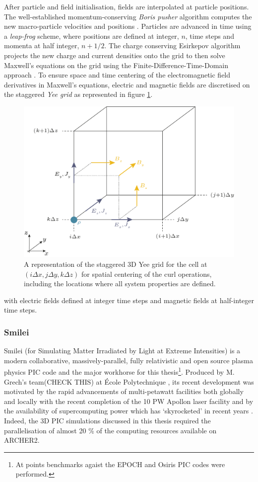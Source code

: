 After particle and field initialisation, fields are interpolated at particle positions. The well-established momentum-conserving \textit{Boris pusher} algorithm computes the new macro-particle velocities and positions \cite{borisRelativisticPlasmaSimulationoptimization1970}. Particles are advanced in time using a \textit{leap-frog }scheme, where positions are defined at integer, $n$, time steps and momenta at half integer, $n + 1/2$. The charge conserving Esirkepov algorithm \cite{esirkepovExactChargeConservation2001} projects the new charge and current densities onto the grid to then solve Maxwell's equations on the grid using the Finite-Difference-Time-Domain approach \cite{tafloveComputationalElectromagneticsFiniteDifference2005}. To ensure space and time centering of the electromagnetic field derivatives in Maxwell's equations, electric and magnetic fields are discretised on the staggered \textit{Yee grid} as represented in figure \ref{fig:introyeegrid}. 
\begin{figure}
	\centering
	\includegraphics[width=0.7\linewidth]{figures/intro/intro_yee_grid}
	\caption[A representation of the staggered Yee grid.]{A representation of the staggered 3D Yee grid for the cell at $(i\Delta x, j\Delta y, k\Delta z)$ for spatial centering of the curl operations, including the locations where all system properties are defined.}
	\label{fig:introyeegrid}
\end{figure}
with electric fields defined at integer time steps and magnetic fields at half-integer time steps.

\subsubsection{Smilei}
Smilei (for Simulating Matter Irradiated by Light at Extreme Intensities) is a modern collaborative, massively-parallel, fully relativistic and open source plasma physics PIC code and the major workhorse for this thesis\footnote{At points benchmarks agaist the EPOCH and Osiris PIC codes were performed.}. Produced by M. Grech's team(CHECK THIS) at École Polytechnique \cite{derouillatSmileiCollaborativeOpensource2018}, its recent development was motivated by the rapid advancements of multi-petawatt facilities both globally and locally with the recent completion of the 10 PW Apollon laser facility and by the availability of supercomputing power which has `skyrocketed' in recent years \cite{derouillatSmileiCollaborativeOpensource2018}. Indeed, the 3D \ac{PIC} simulations discussed in this thesis required the parallelisation of almost 20 \% of the computing resources available on ARCHER2.

